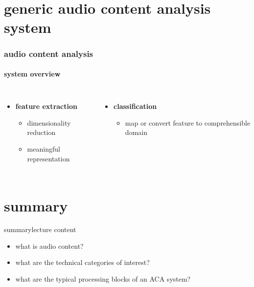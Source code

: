     \section[ACA]{generic audio content analysis system}
        \begin{frame}\frametitle{audio content analysis}\framesubtitle{system overview}
            \begin{figure}
                \centering
            \end{figure}
            
            \begin{columns}
                    \begin{itemize}
                        \item<2->[]	\textbf{feature extraction}
                                \begin{itemize}
                                    \item 	dimensionality reduction
                                    \item	meaningful representation
                                \end{itemize}
                    \end{itemize}
                    \begin{itemize}
                        \item<3->[]	\textbf{classification}
                                \begin{itemize}
                                    \item	map or convert feature to comprehensible domain
                                \end{itemize}
                    \end{itemize}
            \end{columns}
        \end{frame}

    \section{summary}
        \begin{frame}{summary}{lecture content}
            \begin{itemize}
                \item       what is audio content?
                \bigskip
                \item<2->   what are the technical categories of interest?
                \bigskip
                \item<3->   what are the typical processing blocks of an ACA system?
            \end{itemize}
        \end{frame}

